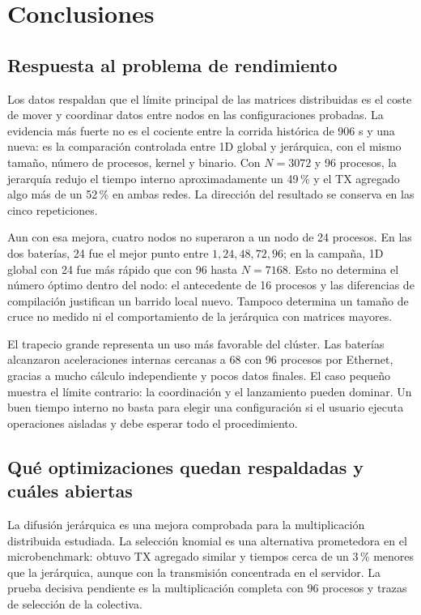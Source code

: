 \section{Conclusiones}

\subsection{Respuesta al problema de rendimiento}

Los datos respaldan que el límite principal de las matrices distribuidas es el coste de mover y coordinar datos entre nodos en las configuraciones probadas. La evidencia más fuerte no es el cociente entre la corrida histórica de 906 s y una nueva: es la comparación controlada entre 1D global y jerárquica, con el mismo tamaño, número de procesos, kernel y binario. Con $N=3072$ y 96 procesos, la jerarquía redujo el tiempo interno aproximadamente un 49\,\% y el TX agregado algo más de un 52\,\% en ambas redes. La dirección del resultado se conserva en las cinco repeticiones.

Aun con esa mejora, cuatro nodos no superaron a un nodo de 24 procesos. En las dos baterías, 24 fue el mejor punto entre $1,24,48,72,96$; en la campaña, 1D global con 24 fue más rápido que con 96 hasta $N=7168$. Esto no determina el número óptimo dentro del nodo: el antecedente de 16 procesos y las diferencias de compilación justifican un barrido local nuevo. Tampoco determina un tamaño de cruce no medido ni el comportamiento de la jerárquica con matrices mayores.

El trapecio grande representa un uso más favorable del clúster. Las baterías alcanzaron aceleraciones internas cercanas a 68 con 96 procesos por Ethernet, gracias a mucho cálculo independiente y pocos datos finales. El caso pequeño muestra el límite contrario: la coordinación y el lanzamiento pueden dominar. Un buen tiempo interno no basta para elegir una configuración si el usuario ejecuta operaciones aisladas y debe esperar todo el procedimiento.

\subsection{Qué optimizaciones quedan respaldadas y cuáles abiertas}

La difusión jerárquica es una mejora comprobada para la multiplicación distribuida estudiada. La selección knomial es una alternativa prometedora en el microbenchmark: obtuvo TX agregado similar y tiempos cerca de un 3\,\% menores que la jerárquica, aunque con la transmisión concentrada en el servidor. La prueba decisiva pendiente es la multiplicación completa con 96 procesos y trazas de selección de la colectiva.

